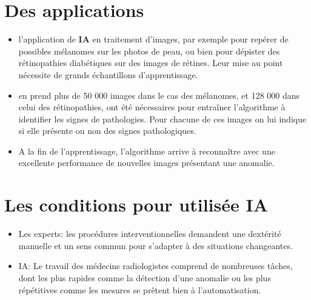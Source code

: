 \section{Des applications}
\begin{itemize}
    \item
        l'application de \textbf{IA} en traitement d'images, par exemple pour repérer de
        possibles mélanomes sur les photos de peau, ou bien pour dépister des
        rétinopathies diabétiques sur des images de rétines. Leur mise au point
        nécessite de grands échantillons d'apprentissage.
    \item
        en prend plus de 50 000 images dans le cas des mélanomes, et 128 000
        dans celui des rétinopathies, ont été nécessaires pour entraîner
        l'algorithme à identifier les signes de pathologies. Pour chacune
        de ces images on lui indique si elle présente ou non des signes
        pathologiques.
    \item
        A la fin de l'apprentissage, l'algorithme arrive à
        reconnaître avec une excellente performance de nouvelles images
        présentant une anomalie.
\end{itemize}

\section{Les conditions pour utilisée IA}
\begin{itemize}
    \item Les experts:
            les procédures interventionnelles demandent une dextérité
            manuelle et un sens commun pour s'adapter à des situations changeantes.
        
    \item IA:
            Le travail des médecins radiologistes comprend de nombreuses tâches,
            dont les plus rapides comme la détection d'une anomalie ou les plus
            répétitives comme les mesures se prêtent bien à l'automatisation.\mybox
        
\end{itemize}
